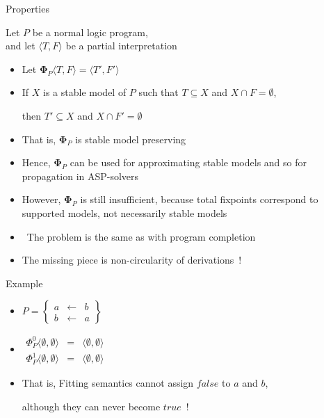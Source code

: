 \begin{frame}{Properties}

  Let $P$ be a normal logic program,\\ and
  let $\langle T,F \rangle$ be a partial interpretation

  \begin{itemize}
  \item<1-> Let ${\mathbf{\Phi}}_P\langle T,F \rangle=\langle T',F'\rangle$
  \item<2-> If $X$ is a stable model of $P$ such that $T\subseteq X$ and $X\cap F=\emptyset$,
    \par then $T'\subseteq X$ and $X\cap F'=\emptyset$
  \item<3-> [] That is, ${\mathbf{\Phi}}_P$ is \alert{stable model preserving}
  \item<3-> [] Hence, ${\mathbf{\Phi}}_P$ can be used for approximating stable models
    and so for propagation in ASP-solvers
    \medskip
  \item <4-> However, ${\mathbf{\Phi}}_P$ is still insufficient, because total fixpoints
    correspond to supported models, not necessarily stable models
  \item<5-> []  \ The problem is the same as with program completion
  \item<6-> [] The missing piece is non-circularity of derivations~!
  \end{itemize}
\end{frame}
\begin{frame}{Example}
  \bigskip
  \begin{itemize}
  \item<1-> []
    \(
    P
    =
    \left\{
      \begin{array}{lcl}
        a &\leftarrow & b \\
        b &\leftarrow & a
      \end{array}
    \right\}
    \)
    \bigskip
  \item<2-> []
    \(
    \begin{array}{lcl}
      \Phi_P^0\langle \emptyset,\emptyset\rangle &=&\langle \emptyset,\emptyset\rangle\\
      \Phi_P^1\langle \emptyset,\emptyset\rangle &=&\langle \emptyset,\emptyset\rangle
    \end{array}
    \)
    \bigskip
  \item<3-> That is, Fitting semantics cannot assign $\mathit{false}$ to $a$ and $b$,

    although they can never become $\mathit{true}$~!
  \end{itemize}
\end{frame}
%
